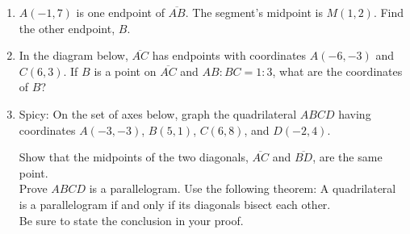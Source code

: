 \documentclass[12pt, twoside]{article}
\begin{document}
\begin{enumerate}
  \item $A(-1,7)$ is one endpoint of $\overline{AB}$. The segment's midpoint is $M(1,2)$. Find the other endpoint, $B$.  \vspace{4cm}

  \item In the diagram below, $\overline{AC}$ has endpoints with coordinates $A(-6,-3)$ and $C(6, 3)$. If $B$ is a point on $\overline{AC}$ and $AB {:} BC = 1{:}3$,  what  are  the coordinates of $B$?
    \begin{flushright} %
    \end{flushright}
    

  \newpage

  \item Spicy: On the set of axes below, graph the quadrilateral $ABCD$ having coordinates $A(-3,-3)$, $B(5,1)$, $C(6,8)$, and $D(-2,4)$.
    \begin{center} %
    \end{center}
    Show that the midpoints of the two diagonals, $\overline{AC}$ and $\overline{BD}$, are the same point. \\[5cm]
    Prove $ABCD$ is a parallelogram. Use the following theorem:
    A quadrilateral is a parallelogram if and only if its diagonals bisect each other. \\[0.5cm]
    Be sure to state the conclusion in your proof.

  \end{enumerate}
  
\end{document}
